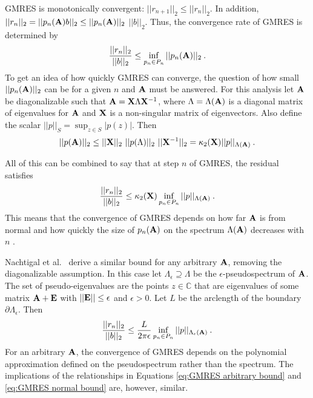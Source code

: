 GMRES is monotonically convergent: $||r_{n+1}||_{2} \le ||r_{n}||_{2}$. In addition, $||r_{n}||_{2} = ||p_{n}(\mathbf{A})b||_{2} \le ||p_{n}(\mathbf{A})||_{2}$ $||b||_{2}$. Thus, the convergence rate of GMRES is determined by
%
\begin{equation}
  \frac{||r_{n}||_{2}}{||b||_{2}} \le \inf_{p_{n}\in P_{n}} ||p_{n}(\mathbf{A})||_{2} \:.
\end{equation}
%
To get an idea of how quickly GMRES can converge, the question of how small $||p_{n}(\mathbf{A})||_{2}$ can be for a given $n$ and $\mathbf{A}$ must be answered. For this analysis let $\mathbf{A}$ be diagonalizable such that $\mathbf{A}=\mathbf{X} \Lambda \mathbf{X}^{-1}$, where $\Lambda = \Lambda(\mathbf{A})$ is a diagonal matrix of eigenvalues for $\mathbf{A}$ and $\mathbf{X}$ is a non-singular matrix of eigenvectors. Also define the scalar $||p||_{S} = \sup_{z\in S} |p(z)|$. Then \cite{Trefethen1997}
%
\begin{equation}
  ||p(\mathbf{A})||_{2} \le ||\mathbf{X}||_{2} \text{ } ||p(\Lambda)||_{2} \text{ } ||\mathbf{X}^{-1}||_{2} = \kappa_{2}(\mathbf{X}) ||p||_{\Lambda(\mathbf{A})} \:.
\end{equation}

All of this can be combined to say that at step $n$ of GMRES, the residual satisfies
%
\begin{equation}
  \frac{||r_{n}||_{2}}{||b||_{2}} \le \kappa_{2}(\mathbf{X})  \inf_{p_{n}\in P_{n}} ||p||_{\Lambda(\mathbf{A})} \:.
  \label{eq:GMRES normal bound}
\end{equation}
%
This means that the convergence of GMRES depends on how far $\mathbf{A}$ is from normal and how quickly the size of $p_{n}(\mathbf{A})$ on the spectrum $\Lambda(\mathbf{A})$ decreases with $n$ \cite{Trefethen1997}. 

Nachtigal et al.\ \cite{Nachtigal1992} derive a similar bound for any arbitrary $\mathbf{A}$, removing the diagonalizable assumption. In this case let $\Lambda_{\epsilon} \supseteq \Lambda$ be the $\epsilon$-pseudospectrum of $\mathbf{A}$. The set of pseudo-eigenvalues are the points $z \in \mathbb{C}$ that are eigenvalues of some matrix $\mathbf{A} + \mathbf{E}$ with $||\mathbf{E}|| \le \epsilon$ and $\epsilon > 0$. Let $L$ be the arclength of the boundary $\partial \Lambda_{\epsilon}$. Then
%
\begin{equation}
  \frac{||r_{n}||_{2}}{||b||_{2}} \le \frac{L}{2 \pi \epsilon} \inf_{p_{n}\in P_{n}} ||p||_{\Lambda_{\epsilon}(\mathbf{A})} \:.
  \label{eq:GMRES arbitrary bound}
\end{equation}
%
For an arbitrary $\mathbf{A}$, the convergence of GMRES depends on the polynomial approximation defined on the pseudospectrum rather than the spectrum. The implications of the relationships in Equations \eqref{eq:GMRES arbitrary bound} and \eqref{eq:GMRES normal bound} are, however, similar.

